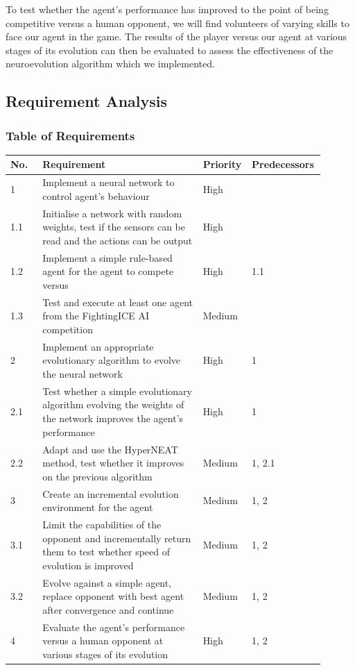 \documentclass[11pt,a4paper]{article}
\begin{document}
To test whether the agent's performance has improved to the point of being competitive versus a human opponent, we will find volunteers of varying skills to face our agent in the game. The results of the player versus our agent at various stages of its evolution can then be evaluated to assess the effectiveness of the neuroevolution algorithm which we implemented.
\newpage
\subsection{Requirement Analysis}
\subsubsection{Table of Requirements}
\begin{tabular}{|p{0.1\linewidth}|p{0.5\linewidth}|p{0.1\linewidth}|p{0.2\linewidth}|}
\hline
No. & Requirement & Priority & Predecessors\\ \hline
1 & Implement a neural network to control agent's behaviour & High &\\ \hline
1.1 & Initialise a network with random weights, test if the sensors can be read and the actions can be output & High &\\ \hline
1.2 & Implement a simple rule-based agent for the agent to compete versus & High & 1.1\\ \hline
1.3 & Test and execute at least one agent from the FightingICE AI competition & Medium &\\ \hline
2 & Implement an appropriate evolutionary algorithm to evolve the neural network & High & 1\\ \hline
2.1 & Test whether a simple evolutionary algorithm evolving the weights of the network improves the agent's performance & High & 1\\ \hline
2.2 & Adapt and use the HyperNEAT method, test whether it improves on the previous algorithm & Medium & 1, 2.1\\ \hline
3 & Create an incremental evolution environment for the agent & Medium & 1, 2\\ \hline
3.1 & Limit the capabilities of the opponent and incrementally return them to test whether speed of evolution is improved & Medium & 1, 2\\ \hline
3.2 & Evolve against a simple agent, replace opponent with best agent after convergence and continue & Medium & 1, 2\\ \hline 
4 & Evaluate the agent's performance versus a human opponent at various stages of its evolution & High & 1, 2\\ \hline
\end{tabular}
\newpage
\end{document}
